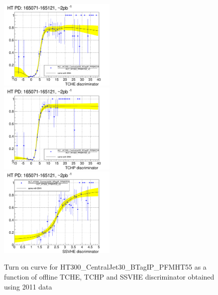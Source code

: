 \begin{figure}[h!]
\centering
\includegraphics[width=0.5\textwidth]{figures/RA2bSUSY_TCHE_turnOn.pdf}
\includegraphics[width=0.5\textwidth]{figures/RA2bSUSY_TCHP_turnOn.pdf}
\includegraphics[width=0.5\textwidth]{figures/RA2bSUSY_SSVHE_turnOn.pdf}
\caption{Turn on curve for HT300\_CentralJet30\_BTagIP\_PFMHT55 as a
  function of offline TCHE, TCHP and SSVHE discriminator obtained using 2011 data}
\label{fig:RA2bturnon}
\end{figure}

